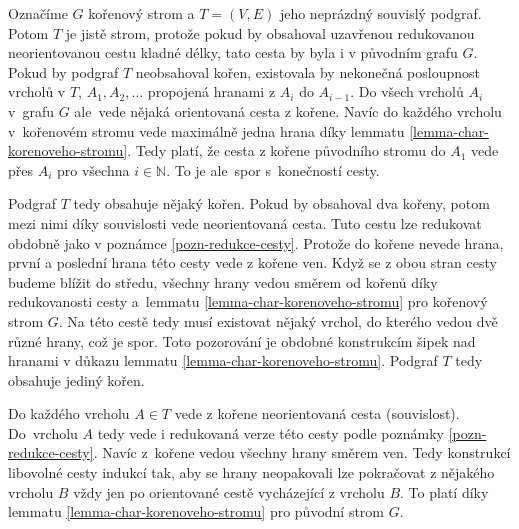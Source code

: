 \begin{dukaz}
    Označíme $G$ kořenový strom a $T = (V,E)$ jeho neprázdný souvislý podgraf. Potom $T$ je jistě strom, protože pokud by obsahoval uzavřenou redukovanou neorientovanou cestu kladné délky, tato cesta by byla i v původním grafu $G$. Pokud by podgraf $T$ neobsahoval kořen, existovala by nekonečná posloupnost vrcholů v $T$, $A_1, A_2, \dots$ propojená hranami z $A_i$ do $A_{i-1}$. Do všech vrcholů $A_i$ v~grafu $G$ ale~vede nějaká orientovaná cesta z kořene. Navíc do každého vrcholu v~kořenovém stromu vede maximálně jedna hrana díky lemmatu \ref{lemma-char-korenoveho-stromu}. Tedy platí, že cesta z kořene původního stromu do $A_1$ vede přes $A_i$ pro všechna $i \in \mathbb{N}$. To je ale~spor s~konečností cesty. 

    Podgraf $T$ tedy obsahuje nějaký kořen. Pokud by obsahoval dva kořeny, potom mezi nimi díky souvislosti vede neorientovaná cesta. Tuto cestu lze redukovat obdobně jako v poznámce \ref{pozn-redukce-cesty}. Protože do kořene nevede hrana, první a poslední hrana této cesty vede z kořene ven. Když se z obou stran cesty budeme blížit do středu, všechny hrany vedou směrem od kořenů díky redukovanosti cesty a~lemmatu \ref{lemma-char-korenoveho-stromu} pro kořenový strom $G$. Na této cestě tedy musí existovat nějaký vrchol, do kterého vedou dvě různé hrany, což je spor. Toto pozorování je obdobné konstrukcím šipek nad hranami v důkazu lemmatu \ref{lemma-char-korenoveho-stromu}. Podgraf $T$ tedy obsahuje jediný kořen.
    
    Do každého vrcholu $A \in T$ vede z kořene neorientovaná cesta (souvislost). Do~vrcholu $A$ tedy vede i redukovaná verze této cesty podle poznámky \ref{pozn-redukce-cesty}. Navíc z~kořene vedou všechny hrany směrem ven. Tedy konstrukcí libovolné cesty indukcí tak, aby se  hrany neopakovali lze pokračovat z nějakého vrcholu $B$ vždy jen po orientované cestě vycházející z vrcholu $B$. To platí díky lemmatu \ref{lemma-char-korenoveho-stromu} pro původní strom $G$. 
    
    
\end{dukaz}

